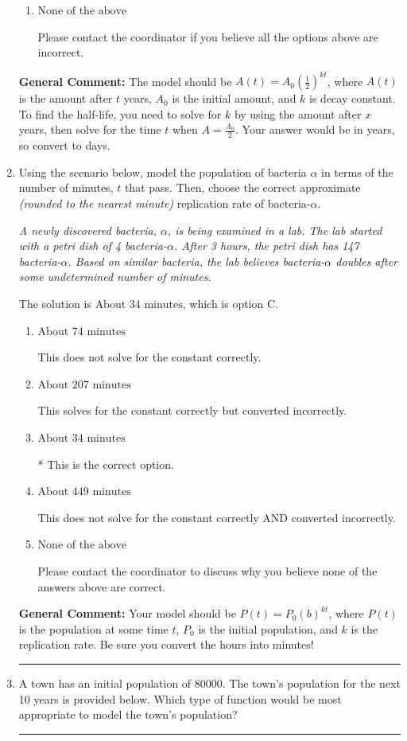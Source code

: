 \documentclass{extbook}[14pt]
\newcommand{\litem}[1]{\item #1

\rule{\textwidth}{0.4pt}}
\begin{document}
\begin{enumerate}
{\begin{enumerate}[label=\Alph*.]
* This is the correct option.
\item \( \text{None of the above} \)

Please contact the coordinator if you believe all the options above are incorrect.
\end{enumerate}

\textbf{General Comment:} The model should be $A(t) = A_0 (\frac{1}{2})^{kt}$, where $A(t)$ is the amount after $t$ years, $A_0$ is the initial amount, and $k$ is decay constant. To find the half-life, you need to solve for $k$ by using the amount after $x$ years, then solve for the time $t$ when $A = \frac{A_0}{2}$. Your answer would be in years, so convert to days.
}
\litem{
Using the scenario below, model the population of bacteria $\alpha$ in terms of the number of minutes, $t$ that pass. Then, choose the correct approximate \textit{(rounded to the nearest minute)} replication rate of bacteria-$\alpha$.

\begin{center}
    \textit{ A newly discovered bacteria, $\alpha$, is being examined in a lab. The lab started with a petri dish of 4 bacteria-$\alpha$. After 3 hours, the petri dish has 147 bacteria-$\alpha$. Based on similar bacteria, the lab believes bacteria-$\alpha$ doubles after some undetermined number of minutes. }
\end{center}
The solution is \( \text{About } 34 \text{ minutes} \), which is option C.\begin{enumerate}[label=\Alph*.]
\item \( \text{About } 74 \text{ minutes} \)

This does not solve for the constant correctly.
\item \( \text{About } 207 \text{ minutes} \)

This solves for the constant correctly but converted incorrectly.
\item \( \text{About } 34 \text{ minutes} \)

* This is the correct option.
\item \( \text{About } 449 \text{ minutes} \)

This does not solve for the constant correctly AND converted incorrectly.
\item \( \text{None of the above} \)

Please contact the coordinator to discuss why you believe none of the answers above are correct.
\end{enumerate}

\textbf{General Comment:} Your model should be $P(t) = P_0(b)^{kt}$, where $P(t)$ is the population at some time $t$, $P_0$ is the initial population, and $k$ is the replication rate. Be sure you convert the hours into minutes!
}
\litem{
A town has an initial population of 80000. The town's population for the next 10 years is provided below. Which type of function would be most appropriate to model the town's population?


}
\end{enumerate}
\end{document}
